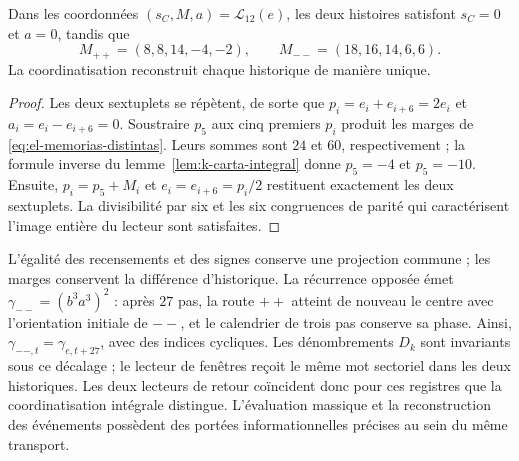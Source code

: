 \begin{proposition}
\label{prop:el-memorias-distintas}
Dans les coordonnées \((s_C,M,a)=\mathcal L_{12}(e)\), les deux histoires
satisfont \(s_C=0\) et \(a=0\), tandis que
\begin{equation}
 M_{++}=(8,8,14,-4,-2),\qquad
 M_{--}=(18,16,14,6,6).
 \label{eq:el-memorias-distintas}
\end{equation}
La coordinatisation reconstruit chaque historique de manière unique.
\end{proposition}
\begin{proof}
Les deux sextuplets se répètent, de sorte que
\(p_i=e_i+e_{i+6}=2e_i\) et \(a_i=e_i-e_{i+6}=0\).
Soustraire \(p_5\) aux cinq premiers \(p_i\) produit les marges
de \eqref{eq:el-memorias-distintas}. Leurs sommes sont \(24\) et
\(60\), respectivement ; la formule inverse du
lemme~\ref{lem:k-carta-integral} donne \(p_5=-4\) et \(p_5=-10\).
Ensuite, \(p_i=p_5+M_i\) et
\(e_i=e_{i+6}=p_i/2\) restituent exactement les deux sextuplets.
La divisibilité par six et les six congruences de
parité qui caractérisent l'image entière du lecteur sont satisfaites.
\end{proof}

L'égalité des recensements et des signes conserve une projection commune ; les
marges conservent la différence d'historique. La récurrence opposée
émet \(\gamma_{--}=(b^3a^3)^2\) : après \(27\) pas, la route
\({++}\) atteint de nouveau le centre avec l'orientation initiale de
\({--}\), et le calendrier de trois pas conserve sa phase. Ainsi,
\(\gamma_{--,t}=\gamma_{e,t+27}\), avec des indices cycliques.
Les dénombrements \(D_k\) sont invariants sous ce décalage ; le
lecteur de fenêtres reçoit le même mot sectoriel dans les deux
historiques. Les deux lecteurs de retour coïncident donc pour
ces registres que la coordinatisation intégrale distingue. L'évaluation massique et
la reconstruction des événements possèdent des portées informationnelles
précises au sein du même transport.
